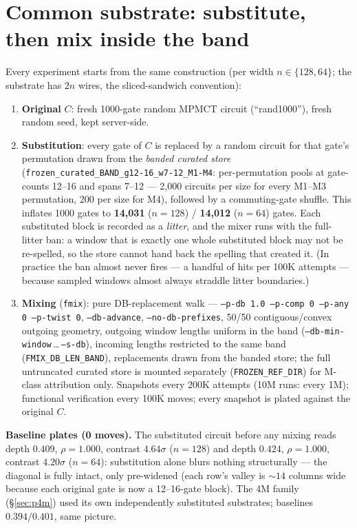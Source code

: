 \documentclass[11pt]{article}
\newcommand{\code}[1]{\texttt{#1}}
\begin{document}
\section{Common substrate: substitute, then mix inside the band}\label{sec:substrate}
Every experiment starts from the same construction (per width $n\in\{128,64\}$; the substrate has $2n$
wires, the sliced-sandwich convention):
\begin{enumerate}
\item \textbf{Original} $C$: fresh 1000-gate random MPMCT circuit (``rand1000''), fresh random seed,
kept server-side.
\item \textbf{Substitution}: every gate of $C$ is replaced by a random circuit for that gate's
permutation drawn from the \emph{banded curated store}
(\code{frozen\_curated\_BAND\_g12-16\_w7-12\_M1-M4}: per-permutation pools at gate-counts 12--16 and
spans 7--12 --- 2{,}000 circuits per size for every M1--M3 permutation, 200 per size for M4), followed
by a commuting-gate shuffle. This inflates 1000 gates to \textbf{14{,}031} ($n{=}128$) /
\textbf{14{,}012} ($n{=}64$) gates. Each substituted block is recorded as a \emph{litter}, and the
mixer runs with the full-litter ban: a window that is exactly one whole substituted block may not be
re-spelled, so the store cannot hand back the spelling that created it. (In practice the ban almost
never fires --- a handful of hits per 100K attempts --- because sampled windows almost always straddle
litter boundaries.)
\item \textbf{Mixing} (\code{fmix}): pure DB-replacement walk — \code{--p-db 1.0 --p-comp 0 --p-any 0
--p-twist 0}, \code{--db-advance}, \code{--no-db-prefixes}, 50/50 contiguous/convex outgoing geometry,
outgoing window lengths uniform in the band (\code{--db-min-window}\,\ldots\,\code{--s-db}), incoming
lengths restricted to the same band (\code{FMIX\_DB\_LEN\_BAND}), replacements drawn from the banded
store; the full untruncated curated store is mounted separately (\code{FROZEN\_REF\_DIR}) for M-class
attribution only. Snapshots every 200K attempts (10M runs: every 1M); functional verification every
100K moves; every snapshot is plated against the original $C$.
\end{enumerate}

\textbf{Baseline plates (0 moves).} The substituted circuit before any mixing reads depth $0.409$,
$\rho=1.000$, contrast $4.64\sigma$ ($n{=}128$) and depth $0.424$, $\rho=1.000$, contrast $4.20\sigma$
($n{=}64$): substitution alone blurs nothing structurally --- the diagonal is fully intact, only
pre-widened (each row's valley is ${\sim}14$ columns wide because each original gate is now a
12--16-gate block). The 4M family (\S\ref{sec:p4m}) used its own independently substituted substrates;
baselines $0.394/0.401$, same picture.
\end{document}

